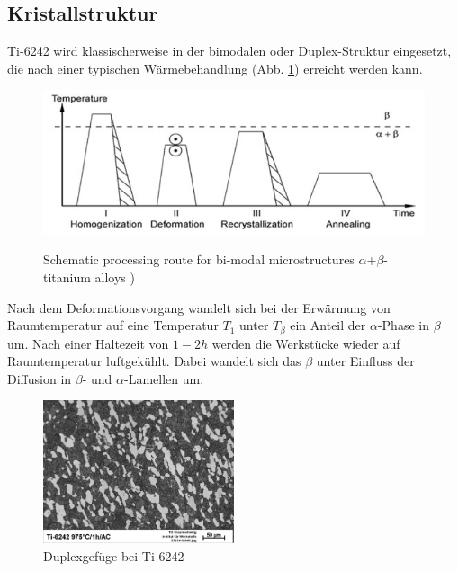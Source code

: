 
\subsection{Kristallstruktur}

Ti-6242 wird klassischerweise in der bimodalen oder Duplex-Struktur eingesetzt, die nach einer typischen Wärmebehandlung (Abb. \ref{fig:WB}) erreicht werden kann.

\begin{figure}[H]
	
	\centering
	
	{\includegraphics[width=1\textwidth]{Bilder/WB}}			
	\caption{Schematic processing route for bi-modal microstructures $\alpha$+$\beta$-titanium alloys )}
	\label{fig:WB}
\end{figure}

Nach dem Deformationsvorgang wandelt sich bei der Erwärmung von Raumtemperatur  auf eine Temperatur $T_1$ unter $T_{\beta}$  ein Anteil der $\alpha$-Phase in $\beta$ um. Nach einer Haltezeit von $1-2h$ werden die Werkstücke wieder auf Raumtemperatur luftgekühlt.
Dabei wandelt sich das $\beta$ unter Einfluss der Diffusion in $\beta$- und $\alpha$-Lamellen um.

\begin{figure}[H]
	\centering
	\includegraphics[width=0.5\textwidth]{Bilder/LM-975-1h-AC}
	\caption{Duplexgefüge bei Ti-6242}
	\label{fig:L.M}
\end{figure}


